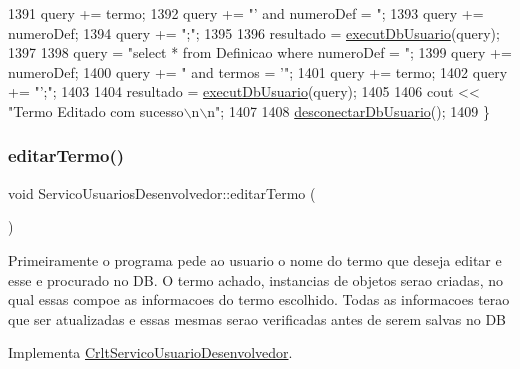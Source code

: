 \begin{DoxyCode}
1391   query += termo;
1392   query += \textcolor{stringliteral}{"' and numeroDef = "};
1393   query += numeroDef;
1394   query += \textcolor{stringliteral}{";"};
1395 
1396      resultado = \mbox{\hyperlink{comando_sql_8cpp_a748197580e7f9acdbf48c78de1f7924b}{executDbUsuario}}(query);
1397 
1398      query = \textcolor{stringliteral}{"select * from Definicao where numeroDef = "};
1399      query += numeroDef;
1400      query += \textcolor{stringliteral}{" and termos = '"};
1401      query += termo;
1402      query += \textcolor{stringliteral}{"';"};
1403 
1404      resultado = \mbox{\hyperlink{comando_sql_8cpp_a748197580e7f9acdbf48c78de1f7924b}{executDbUsuario}}(query);
1405 
1406      cout << \textcolor{stringliteral}{"Termo Editado com sucesso\(\backslash\)n\(\backslash\)n"};
1407 
1408      \mbox{\hyperlink{comando_sql_8cpp_a969be9911913568e30d4ae8963338bc3}{desconectarDbUsuario}}();
1409  \}
\end{DoxyCode}
\mbox{\label{class_servico_usuarios_desenvolvedor_afb392520e6ea1209abb42ad0327673e0}} 
\subsubsection{\texorpdfstring{editar\+Termo()}{editarTermo()}}
{\footnotesize\ttfamily void Servico\+Usuarios\+Desenvolvedor\+::editar\+Termo (\begin{DoxyParamCaption}{ }\end{DoxyParamCaption})\hspace{0.3cm}{\ttfamily [virtual]}}

Primeiramente o programa pede ao usuario o nome do termo que deseja editar e esse e procurado no DB. O termo achado, instancias de objetos serao criadas, no qual essas compoe as informacoes do termo escolhido. Todas as informacoes terao que ser atualizadas e essas mesmas serao verificadas antes de serem salvas no DB

Implementa \mbox{\hyperlink{class_crlt_servico_usuario_desenvolvedor_a60098c3dd81dfb83ea03f4b7ace785dc}{Crlt\+Servico\+Usuario\+Desenvolvedor}}.


